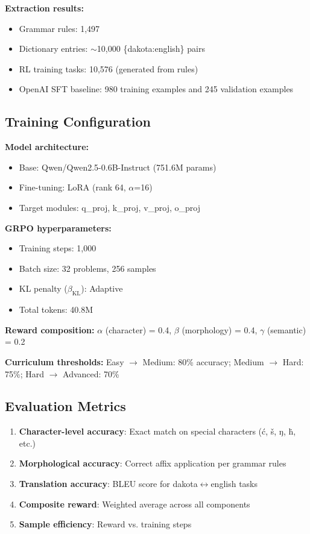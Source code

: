\documentclass{article}
\begin{document}
\textbf{Extraction results:}
\begin{itemize}
    \item Grammar rules: 1,497
    \item Dictionary entries: $\sim$10,000 \{dakota:english\} pairs
    \item RL training tasks: 10,576 (generated from rules)
    \item OpenAI SFT baseline: 980 training examples and 245 validation examples
\end{itemize}

\subsection{Training Configuration}

\textbf{Model architecture:}
\begin{itemize}
    \item Base: Qwen/Qwen2.5-0.6B-Instruct (751.6M params)
    \item Fine-tuning: LoRA (rank 64, $\alpha$=16)
    \item Target modules: q\_proj, k\_proj, v\_proj, o\_proj
\end{itemize}

\textbf{GRPO hyperparameters:}
\begin{itemize}
    \item Training steps: 1,000
    \item Batch size: 32 problems, 256 samples
    \item KL penalty ($\beta_{\text{KL}}$): Adaptive
    \item Total tokens: 40.8M
\end{itemize}

\textbf{Reward composition:}
$\alpha$ (character) = 0.4, $\beta$ (morphology) = 0.4, $\gamma$ (semantic) = 0.2

\textbf{Curriculum thresholds:}
Easy $\rightarrow$ Medium: 80\% accuracy; Medium $\rightarrow$ Hard: 75\%; Hard $\rightarrow$ Advanced: 70\%

\subsection{Evaluation Metrics}

\begin{enumerate}
    \item \textbf{Character-level accuracy}: Exact match on special characters (ć, š, ŋ, ḣ, etc.)
    \item \textbf{Morphological accuracy}: Correct affix application per grammar rules
    \item \textbf{Translation accuracy}: BLEU score for dakota$\leftrightarrow$english tasks
    \item \textbf{Composite reward}: Weighted average across all components
    \item \textbf{Sample efficiency}: Reward vs. training steps
\end{enumerate}
\end{document}
